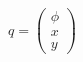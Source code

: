 \documentclass[preview]{standalone}
\begin{document}
\begin{center}
$q = \begin{pmatrix}\phi\\x\\y \end{pmatrix}$
\end{center}
\end{document}
